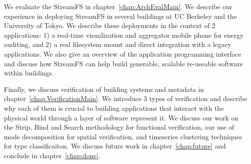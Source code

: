 We evaluate the StreamFS in chapter~\ref{chap:ArchEvalMain}.  We describe our experience in deploying StreamFS in several buildings
at UC Berkeley and the University of Tokyo.  We describe these deployments in the context of 2 applications: 1) a real-time visualization and 
aggregator mobile phone for energy auditing, and  2) a real filesystem mount and direct integration with a legacy applications. 
We also give an overview of the application programming interface and discuss how StreamFS can help build generable, scalable 
re-useable software within buildings.

Finally, we discuss verification of building systems and metadata in chapter~\ref{chap:VerificationMain}.  We introduce 3 types of 
verification and describe why each of them is crucial to building applications that interact with the physical world through
a layer of software represent it.  We discuss our work on the Strip, Bind and Search methodology for functional verification, 
our use of mode decomposition for spatial verification, and timeseries clustering techniques for type classificaiton.  
We discuss future work in chapter~\ref{chap:future} and conclude in chapter~\ref{chap:done}.




























